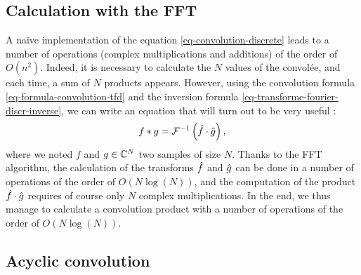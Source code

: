 \subsection{Calculation with the FFT}
\label{sect1-convolution-calcul-fft} 
 
A naive implementation of the equation \eqref{eq-convolution-discrete} leads to a number of operations (complex multiplications and additions) of the order of $ O(n^2) $. Indeed, it is necessary to calculate the $N$ values of the convolée, and each time, a sum of $N$ products appears. However, using the convolution formula \eqref{eq-formula-convolution-tfd} and the inversion formula \eqref{eq-transforme-fourier-discr-inverse}, we can write an equation that will turn out to be very useful :
\begin{equation*}
f * g = \mathcal{F}^{-1} \left(\hat{f} \cdot \hat{g} \right),
\end{equation*}
where we noted $ f $ and $ g \in \mathbb{C}^N $ two samples of size $N$. Thanks to the FFT algorithm, the calculation of the transforms $ \hat{f} $ and $ \hat{g} $ can be done in a number of operations of the order of $ O(N \log (N) ) $, and the computation of the product $ \hat{f} \cdot \hat{g} $ requires of course only $N$ complex multiplications. In the end, we thus manage to calculate a convolution product with a number of operations of the order of $ O(N \log (N))$.

\subsection{Acyclic convolution}
\label{sect1-convolution-acyclic} 
 
